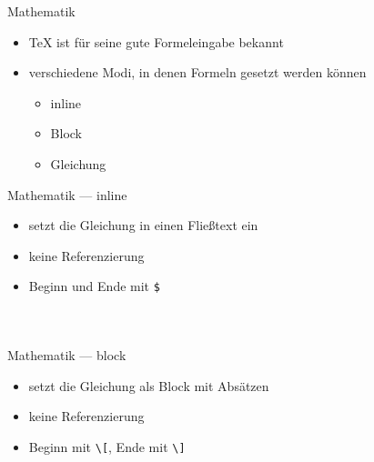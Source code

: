 \documentclass[presentation,aspectratio=169]{beamer}
\begin{document}
\begin{frame}{Mathematik}
  \begin{itemize}
    \item \TeX{} ist für seine gute Formeleingabe bekannt
    \item verschiedene Modi, in denen Formeln gesetzt werden können
      \begin{itemize}
        \item inline
        \item Block
        \item Gleichung
      \end{itemize}
  \end{itemize}
\end{frame}

\begin{frame}[fragile]{Mathematik --- inline}
  \begin{itemize}
    \item setzt die Gleichung in einen Fließtext ein
    \item keine Referenzierung
    \item Beginn und Ende mit \verb|$|
  \end{itemize}
  
  \begin{columns}
    \begin{column}{.4\textwidth}
      
    \end{column}
    \begin{column}{.4\textwidth}
      \inputminted{latex}{codebeispiele/math-inline.tex}
    \end{column}
  \end{columns}
\end{frame}

\begin{frame}[fragile]{Mathematik --- block}
  \begin{itemize}
    \item setzt die Gleichung als Block mit Absätzen
    \item keine Referenzierung
    \item Beginn mit \verb|\[|, Ende mit \verb|\]|
  \end{itemize}
  
  \bigskip

  \begin{columns}
    \begin{column}{.4\textwidth}
      
    \end{column}
    \begin{column}{.4\textwidth}
      \inputminted{latex}{codebeispiele/math-block.tex}
    \end{column}
  \end{columns}
\end{frame}
\end{document}
